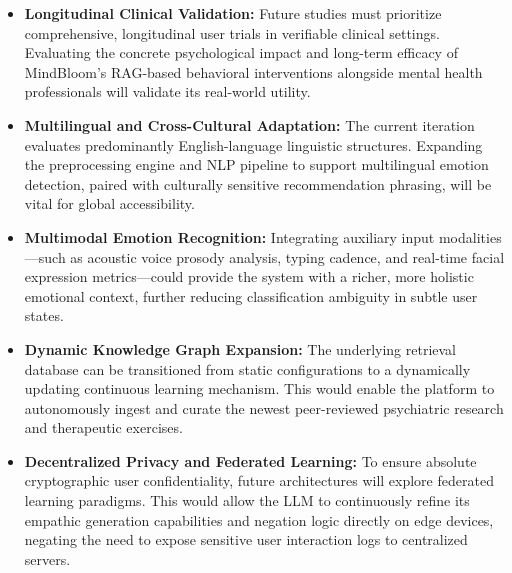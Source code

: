\documentclass[12pt,twoside]{article}
\begin{document}
\begin{itemize}[leftmargin=2em]
  \item \textbf{Longitudinal Clinical Validation:} Future studies must prioritize comprehensive, longitudinal user trials in verifiable clinical settings. Evaluating the concrete psychological impact and long-term efficacy of MindBloom's RAG-based behavioral interventions alongside mental health professionals will validate its real-world utility.

  \item \textbf{Multilingual and Cross-Cultural Adaptation:} The current iteration evaluates predominantly English-language linguistic structures. Expanding the preprocessing engine and NLP pipeline to support multilingual emotion detection, paired with culturally sensitive recommendation phrasing, will be vital for global accessibility.

  \item \textbf{Multimodal Emotion Recognition:} Integrating auxiliary input modalities---such as acoustic voice prosody analysis, typing cadence, and real-time facial expression metrics---could provide the system with a richer, more holistic emotional context, further reducing classification ambiguity in subtle user states.

  \item \textbf{Dynamic Knowledge Graph Expansion:} The underlying retrieval database can be transitioned from static configurations to a dynamically updating continuous learning mechanism. This would enable the platform to autonomously ingest and curate the newest peer-reviewed psychiatric research and therapeutic exercises.

  \item \textbf{Decentralized Privacy and Federated Learning:} To ensure absolute cryptographic user confidentiality, future architectures will explore federated learning paradigms. This would allow the LLM to continuously refine its empathic generation capabilities and negation logic directly on edge devices, negating the need to expose sensitive user interaction logs to centralized servers.
\end{itemize}
\end{document}
